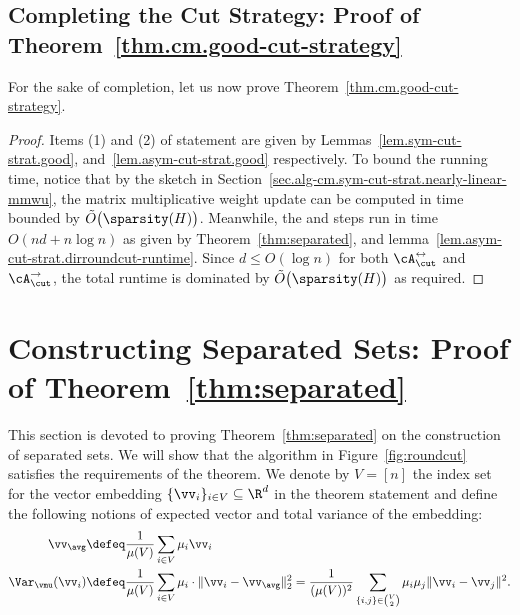 \documentclass[letterpaper]{article}
\begin{document}
\subsection{Completing the Cut Strategy: Proof of Theorem~\ref{thm.cm.good-cut-strategy}}

For the sake of completion, let us now prove Theorem~\ref{thm.cm.good-cut-strategy}.

\cmGoodCutStrategy*
\begin{proof}
Items (1) and (2) of statement are given by Lemmas~\ref{lem.sym-cut-strat.good}, and~\ref{lem.asym-cut-strat.good} respectively. To bound the running time, notice that by the sketch in Section~\ref{sec.alg-cm.sym-cut-strat.nearly-linear-mmwu}, the matrix multiplicative weight update can be computed in time bounded by $\tilde{O}\big( \sparsity(H) \big)$. Meanwhile, the \roundcut and \dirroundcut steps run in time $O(nd + n \log n)$ as given by Theorem~\ref{thm:separated}, and lemma~\ref{lem.asym-cut-strat.dirroundcut-runtime}. Since $d \leq O(\log n)$ for both $\cA_{\cut}^{\leftrightarrow}$ and $\cA_{\cut}^{\rightarrow}$, the total runtime is dominated by $\tilde{O}\big( \sparsity(H) \big)$ as required.
\end{proof}
 

\section{Constructing Separated Sets: Proof of Theorem~\ref{thm:separated}}
\label{sec.separated}

This section is devoted to proving Theorem~\ref{thm:separated} on the construction of separated sets. We will show that the algorithm \roundcut in Figure~\ref{fig:roundcut} satisfies the requirements of the theorem.
We denote by $V = [n]$ the index set for the vector embedding $\{ \vv_i \}_{i \in V} \subseteq \R^d$ in the theorem statement and define the following notions of expected vector and total variance of the embedding:
\begin{align*}
\vv_{\avg}
&\defeq \frac{1}{\mu(V)} \sum_{i \in V} \mu_i \vv_i \\
\Var_{\vmu} (\vv_i)
&\defeq \frac{1}{\mu(V)}\sum_{i \in V} \mu_i \cdot \lVert \vv_i - \vv_{\avg} \rVert_2^2
= \frac{1}{(\mu(V))^2} \sum_{\{i,j\} \in \binom{V}{2}} \mu_i \mu_j \|\vv_i - \vv_j\|^2 .
\end{align*}
\end{document}
